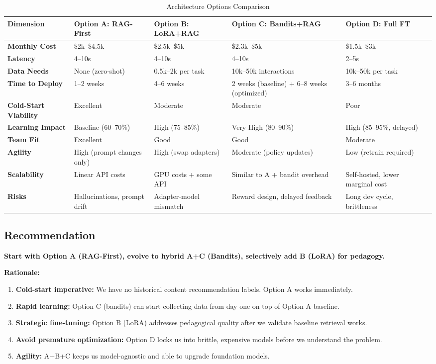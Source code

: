 \documentclass[11pt,letterpaper]{article}
\begin{document}
\begin{table}[H]
\centering
\small
\begin{tabular}{@{}p{2.5cm}p{2.3cm}p{2.3cm}p{2.3cm}p{2.3cm}p{2.3cm}@{}}
\toprule
\textbf{Dimension} & \textbf{Option A: RAG-First} & \textbf{Option B: LoRA+RAG} & \textbf{Option C: Bandits+RAG} & \textbf{Option D: Full FT} \\
\midrule
\textbf{Monthly Cost} & \$2k--\$4.5k & \$2.5k--\$5k & \$2.3k--\$5k & \$1.5k--\$3k \\
\textbf{Latency} & 4--10s & 4--10s & 4--10s & 2--5s \\
\textbf{Data Needs} & None (zero-shot) & 0.5k--2k per task & 10k--50k interactions & 10k--50k per task \\
\textbf{Time to Deploy} & 1--2 weeks & 4--6 weeks & 2 weeks (baseline) + 6--8 weeks (optimized) & 3--6 months \\
\textbf{Cold-Start Viability} & Excellent & Moderate & Moderate & Poor \\
\textbf{Learning Impact} & Baseline (60--70\%) & High (75--85\%) & Very High (80--90\%) & High (85--95\%, delayed) \\
\textbf{Team Fit} & Excellent & Good & Good & Moderate \\
\textbf{Agility} & High (prompt changes only) & High (swap adapters) & Moderate (policy updates) & Low (retrain required) \\
\textbf{Scalability} & Linear API costs & GPU costs + some API & Similar to A + bandit overhead & Self-hosted, lower marginal cost \\
\textbf{Risks} & Hallucinations, prompt drift & Adapter-model mismatch & Reward design, delayed feedback & Long dev cycle, brittleness \\
\bottomrule
\end{tabular}
\caption{Architecture Options Comparison}
\label{tab:arch-compare}
\end{table}

\subsection{Recommendation}\label{subsec:recommendation}

\textbf{Start with Option A (RAG-First), evolve to hybrid A+C (Bandits), selectively add B (LoRA) for pedagogy.}

\textbf{Rationale:}
\begin{enumerate}
\item \textbf{Cold-start imperative:} We have no historical content recommendation labels. Option A works immediately.
\item \textbf{Rapid learning:} Option C (bandits) can start collecting data from day one on top of Option A baseline.
\item \textbf{Strategic fine-tuning:} Option B (LoRA) addresses pedagogical quality after we validate baseline retrieval works.
\item \textbf{Avoid premature optimization:} Option D locks us into brittle, expensive models before we understand the problem.
\item \textbf{Agility:} A+B+C keeps us model-agnostic and able to upgrade foundation models.
\end{enumerate}
\end{document}
